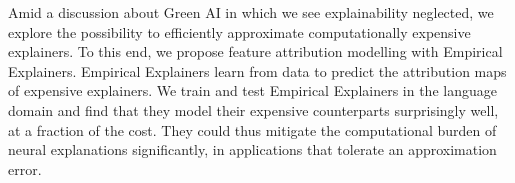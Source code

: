 Amid a discussion about Green AI in which we see explainability neglected, we explore the possibility to efficiently approximate computationally expensive explainers. To this end, we propose feature attribution modelling with Empirical Explainers. Empirical Explainers learn from data to predict the attribution maps of expensive explainers. We train and test Empirical Explainers in the language domain and find that they model their expensive counterparts surprisingly well, at a fraction of the cost. They could thus mitigate the computational burden of neural explanations significantly, in applications that tolerate an approximation error.
